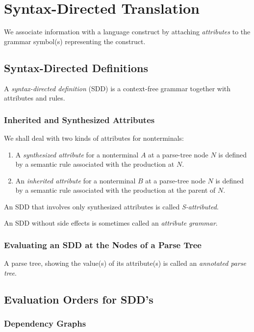 \documentclass[12pt,a4paper,twoside,openany]{book}
\begin{document}
\chapter{Syntax-Directed Translation}

We associate information with a language construct by attaching \textit{attributes} to the grammar symbol(s) representing the construct.

\section{Syntax-Directed Definitions}

A \textit{syntax-directed definition} (SDD) is a context-free grammar together with attributes and rules.

\subsection{Inherited and Synthesized Attributes}

We shall deal with two kinds of attributes for nonterminals:
\begin{enumerate}
    \item A \textit{synthesized attribute} for a nonterminal $A$ at a parse-tree node $N$ is defined by a semantic rule associated with the production at $N$.
    \item An \textit{inherited attribute} for a nonterminal $B$ at a parse-tree node $N$ is defined by a semantic rule associated with the production at the parent of $N$.
\end{enumerate}

An SDD that involves only synthesized attributes is called \textit{S-attributed}.

An SDD without side effects is sometimes called an \textit{attribute grammar}.

\subsection{Evaluating an SDD at the Nodes of a Parse Tree}

A parse tree, showing the value(s) of its attribute(s) is called an \textit{annotated parse tree}.

\section{Evaluation Orders for SDD's}
\subsection{Dependency Graphs}
\end{document}
